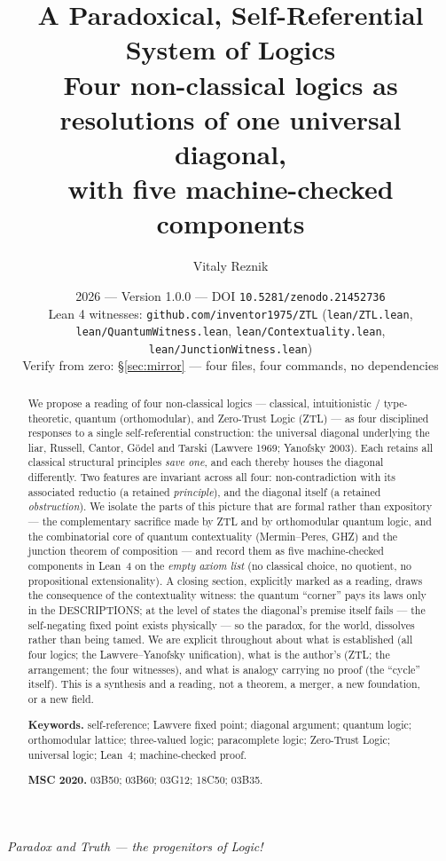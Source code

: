 \documentclass[11pt]{article}
\title{\textbf{A Paradoxical, Self-Referential System of Logics}\\[4pt]
\large Four non-classical logics as resolutions of one universal diagonal,\\
with five machine-checked components}
\author{Vitaly Reznik}
\date{2026 --- Version 1.0.0 --- DOI \texttt{10.5281/zenodo.21452736}\\[2pt]
\small Lean 4 witnesses: \texttt{github.com/inventor1975/ZTL}
(\texttt{lean/ZTL.lean}, \texttt{lean/QuantumWitness.lean}, \texttt{lean/Contextuality.lean}, \texttt{lean/JunctionWitness.lean})\\
\small Verify from zero: \S\ref{sec:mirror} --- four files, four commands, no dependencies}
\theoremstyle{remark}
\begin{document}
\maketitle

\begin{center}
\emph{Paradox and Truth --- the progenitors of Logic!}
\end{center}
\vspace{4pt}

\begin{abstract}
We propose a reading of four non-classical logics --- classical,
intuitionistic / type-theoretic, quantum (orthomodular), and Zero-Trust
Logic (ZTL) --- as four disciplined responses to a single self-referential
construction: the universal diagonal underlying the liar, Russell, Cantor,
G\"odel and Tarski (Lawvere 1969; Yanofsky 2003). Each retains all classical
structural principles \emph{save one}, and each thereby houses the diagonal
differently. Two features are invariant across all four: non-contradiction
with its associated reductio (a retained \emph{principle}), and the diagonal
itself (a retained \emph{obstruction}). We isolate the parts of this
picture that are formal rather than expository --- the complementary sacrifice
made by ZTL and by orthomodular quantum logic, and the combinatorial core of
quantum contextuality (Mermin--Peres, GHZ) and the junction theorem of
composition --- and record them as five machine-checked components in Lean~4 on the \emph{empty axiom list} (no
classical choice, no quotient, no propositional extensionality). A closing
section, explicitly marked as a reading, draws the consequence of the
contextuality witness: the quantum ``corner'' pays its laws only in the
DESCRIPTIONS; at the level of states the diagonal's premise itself fails ---
the self-negating fixed point exists physically --- so the paradox, for the
world, dissolves rather than being tamed. We are
explicit throughout about what is established (all four logics; the
Lawvere--Yanofsky unification), what is the author's (ZTL; the arrangement;
the four witnesses), and what is analogy carrying no proof (the ``cycle''
itself). This is a synthesis and a reading, not a theorem, a merger, a new
foundation, or a new field.

\smallskip
\noindent\textbf{Keywords.} self-reference; Lawvere fixed point; diagonal
argument; quantum logic; orthomodular lattice; three-valued logic;
paracomplete logic; Zero-Trust Logic; universal logic; Lean~4;
machine-checked proof.

\smallskip
\noindent\textbf{MSC 2020.} 03B50; 03B60; 03G12; 18C50; 03B35.
\end{abstract}
\end{document}
